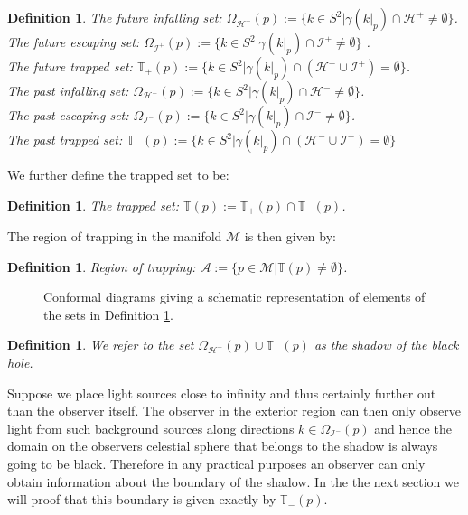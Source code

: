 \documentclass[reqno]{amsart}
\numberwithin{equation}{section}
\theoremstyle{plain}
\newtheorem{definition}[thm]{Definition}
\theoremstyle{definition}
\begin{document}
\begin{definition}\label{def:futinf}
The future infalling set: $\Omega_{\mathcal{H}^+}(p):=  \{k\in S^2 | \gamma(k|_p)\cap\mathcal{H}^+ \neq \emptyset \} $.\\
The future escaping set: $\Omega_{\mathcal{I}^+}(p):=  \{k\in S^2| \gamma(k|_p)\cap\mathcal{I}^+ \neq \emptyset \}$ .\\
The future trapped set: $\mathbb{T}_+(p) := \{k\in S^2 | \gamma(k|_p)\cap(\mathcal{H}^+\cup \mathcal{I}^+)  = \emptyset \}$.\\
The past infalling set: $\Omega_{\mathcal{H}^-}(p):=  \{k\in S^2 | \gamma(k|_p)\cap\mathcal{H}^- \neq \emptyset \}$.\\
The past escaping set: $\Omega_{\mathcal{I}^-}(p):= \{k\in S^2 | \gamma(k|_p)\cap\mathcal{I}^- \neq \emptyset \}$.\\
The past trapped set: $\mathbb{T}_- (p):= \{k\in S^2 | \gamma(k|_p)\cap(\mathcal{H}^-\cup \mathcal{I}^-)  = \emptyset \}$
\end{definition}
\noindent We further define the trapped set to be: 
\begin{definition}
The trapped set: $\mathbb{T}(p):= \mathbb{T}_+(p)\cap\mathbb{T}_-(p)$.
\end{definition}
\noindent The region of trapping in the manifold $\mathcal{M}$ is then given by:
\begin{definition}
Region of trapping: $\mathcal{A}:= \{p\in \mathcal{M}| \mathbb{T}(p)\neq \emptyset\}$.
\end{definition}
\begin{figure}[t!]
\centering
\centering
  \hfill
  \hfill
\caption{Conformal diagrams giving a schematic representation of elements of the sets in Definition \ref{def:futinf}. }
\label{fig:causal}
\end{figure}

\begin{definition}
We refer to the set $\Omega_{\mathcal{H}^-}(p)\cup \mathbb{T}_-(p)$ as the shadow of the black hole. 
\end{definition}
\noindent Suppose we place light sources close to infinity and thus certainly further out than the observer itself. The observer in the exterior region can then only observe light from such background sources along directions $k\in \Omega_{\mathcal{I}^-}(p)$ and hence the domain on the observers celestial sphere that belongs to the shadow is always going to be black. Therefore in any practical purposes an observer can only obtain information about the boundary of the shadow. In the the next section we will proof that this boundary is given exactly by $\mathbb{T}_-(p)$. 
\end{document}
